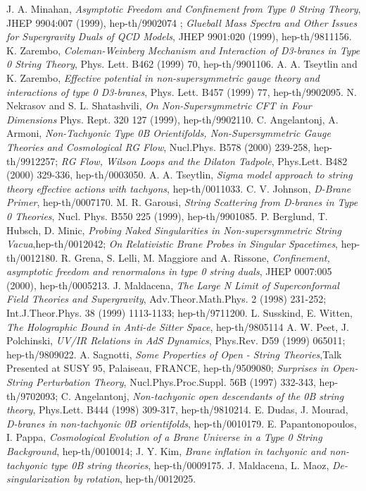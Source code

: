 \documentclass[a4paper,12pt]{article}
\begin{document}
\begin{thebibliography}{99}
 J. A. Minahan, {\it Asymptotic Freedom and Confinement from Type 0 String Theory}, JHEP 9904:007 (1999), hep-th/9902074 ; {\it Glueball Mass Spectra and Other Issues for Supergravity Duals of QCD Models}, JHEP 9901:020 (1999), hep-th/9811156. 
 K. Zarembo, {\it Coleman-Weinberg Mechanism and Interaction of D3-branes in Type 0 String Theory}, Phys. Lett. B462 (1999) 70, hep-th/9901106. 
 A. A. Tseytlin and K. Zarembo, {\it Effective potential in non-supersymmetric \coordHE{} gauge theory and interactions of type 0 D3-branes}, Phys. Lett. B457 (1999) 77, hep-th/9902095.
 N. Nekrasov and S. L. Shatashvili, {\it On Non-Supersymmetric CFT in Four Dimensions} Phys. Rept. 320 127 (1999), hep-th/9902110.  
C. Angelantonj, A. Armoni, {\it Non-Tachyonic Type 0B Orientifolds, Non-Supersymmetric Gauge Theories and Cosmological RG Flow}, Nucl.Phys. B578 (2000) 239-258, hep-th/9912257; {\it RG Flow, Wilson Loops and the Dilaton Tadpole}, Phys.Lett. B482 (2000) 329-336, hep-th/0003050.
 A. A. Tseytlin, {\it Sigma model approach to string theory effective actions with tachyons}, hep-th/0011033.
 C. V. Johnson, {\it D-Brane Primer}, hep-th/0007170.
 M. R. Garousi, {\it String Scattering from D-branes in Type 0 Theories}, 
Nucl. Phys. B550 225 (1999), hep-th/9901085.
 P. Berglund, T. Hubsch, D. Minic, {\it Probing Naked Singularities in Non-supersymmetric String Vacua},hep-th/0012042; {\it On Relativistic Brane Probes in Singular Spacetimes}, hep-th/0012180.
 R. Grena, S. Lelli, M. Maggiore and A. Rissone, {\it Confinement, asymptotic freedom and renormalons in type 0 string duals}, JHEP 0007:005 (2000), hep-th/0005213.
J. Maldacena, {\it The Large N Limit of Superconformal Field Theories and Supergravity},
Adv.Theor.Math.Phys. 2 (1998) 231-252; Int.J.Theor.Phys. 38 (1999) 1113-1133; 
hep-th/9711200. 
L. Susskind, E. Witten, {\it The Holographic Bound in Anti-de Sitter Space},
hep-th/9805114 
 A. W. Peet, J. Polchinski, {\it UV/IR Relations in AdS Dynamics},
Phys.Rev. D59 (1999) 065011; hep-th/9809022.
A. Sagnotti, {\it Some Properties of Open - String Theories},Talk Presented at SUSY 95, Palaiseau, FRANCE, hep-th/9509080; {\it Surprises in Open-String Perturbation Theory}, Nucl.Phys.Proc.Suppl. 56B (1997) 332-343, hep-th/9702093; C. Angelantonj, {\it  Non-tachyonic open descendants of the 0B string theory}, Phys.Lett. B444 (1998) 309-317, hep-th/9810214. 
 E. Dudas, J. Mourad, {\it D-branes in non-tachyonic 0B orientifolds}, hep-th/0010179.
 E. Papantonopoulos, I. Pappa, {\it Cosmological Evolution of a Brane Universe in a Type 0 String Background}, hep-th/0010014; J. Y. Kim, {\it Brane inflation in tachyonic and non-tachyonic type 0B string theories}, hep-th/0009175.
 J. Maldacena, L. Maoz, {\it De-singularization by rotation}, hep-th/0012025.










\end{thebibliography}
\end{document}
